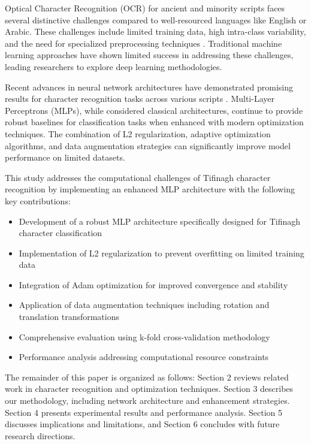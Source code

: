 \documentclass[12pt,a4paper]{article}
\begin{document}
	Optical Character Recognition (OCR) for ancient and minority scripts faces several distinctive challenges compared to well-resourced languages like English or Arabic. These challenges include limited training data, high intra-class variability, and the need for specialized preprocessing techniques \cite{ancient_scripts_ocr}. Traditional machine learning approaches have shown limited success in addressing these challenges, leading researchers to explore deep learning methodologies.
	
	Recent advances in neural network architectures have demonstrated promising results for character recognition tasks across various scripts \cite{deep_learning_ocr}. Multi-Layer Perceptrons (MLPs), while considered classical architectures, continue to provide robust baselines for classification tasks when enhanced with modern optimization techniques. The combination of L2 regularization, adaptive optimization algorithms, and data augmentation strategies can significantly improve model performance on limited datasets.
	
	This study addresses the computational challenges of Tifinagh character recognition by implementing an enhanced MLP architecture with the following key contributions:
	
	\begin{itemize}
		\item Development of a robust MLP architecture specifically designed for Tifinagh character classification
		\item Implementation of L2 regularization to prevent overfitting on limited training data
		\item Integration of Adam optimization for improved convergence and stability
		\item Application of data augmentation techniques including rotation and translation transformations
		\item Comprehensive evaluation using k-fold cross-validation methodology
		\item Performance analysis addressing computational resource constraints
	\end{itemize}
	
	The remainder of this paper is organized as follows: Section 2 reviews related work in character recognition and optimization techniques. Section 3 describes our methodology, including network architecture and enhancement strategies. Section 4 presents experimental results and performance analysis. Section 5 discusses implications and limitations, and Section 6 concludes with future research directions.
	
\end{document}
